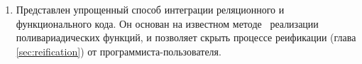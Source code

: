\begin{enumerate}

\item Представлен упрощенный способ интеграции реляционного и функционального кода.
Он основан на известном методе~\cite{Unparsing, DoWeNeed}  реализации поливариадических функций, и позволяет скрыть процессе реификации (глава \ref{sec:reification}) от программиста-пользователя.
\end{enumerate}

